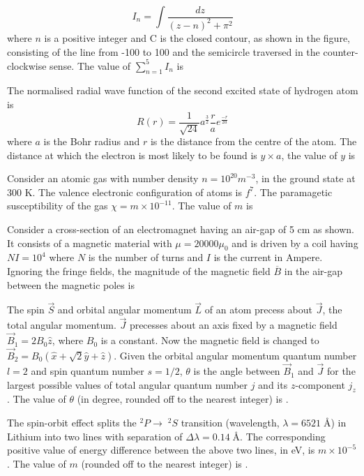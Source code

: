 		$$ I_n = \int \frac{dz}{(z-n)^2 + \pi^2} $$
		where $n$ is a positive integer and C is the closed contour, as shown in the figure, consisting of the line from -100 to 100 and the semicircle traversed in the counter-clockwise sense. The value of $\sum_{n=1}^{5} I_n $ is
	\item The normalised radial wave function of the second excited state of hydrogen atom is 
		$$ R(r) = \frac{1}{\sqrt{24}} a^{\frac{3}{2}} \frac{r}{a} e^{\frac{-r}{2a}} $$
		where $a$ is the Bohr radius and $r$ is the distance from the centre of the atom. The distance at which the electron is most likely to be found is $y \times a$, the value of $y$ is
	\item Consider an atomic gas with number density $n = 10^{20} m^{-3} $, in the ground state at 300 K. The valence electronic configuration of atoms is $f^7$. The paramagetic susceptibility of the gas $\chi = m \times 10^{-11}$. The value of $m$ is
	\item Consider a cross-section of an electromagnet having an air-gap of 5 cm as shown. It consists of a magnetic material with $\mu = 20000 \mu_0$ and is driven by a coil having $NI = 10^4$ where $N$ is the number of turns and $I$ is the current in Ampere.
		Ignoring the fringe fields, the magnitude of the magnetic field $\overline{B}$ in the air-gap between the magnetic poles is
	\item The spin $\vec{S}$ and orbital angular momentum $\vec{L}$ of an atom precess about $\vec{J}$, the total angular momentum. $\vec{J}$ precesses about an axis fixed by a magnetic field $\vec{B}_1 = 2B_0 \hat{z}$, where $B_0$ is a constant. Now the magnetic field is changed to
 $\vec{B}_2 = B_0 (\hat{x} + \sqrt{2} \hat{y} + \hat{z}).$ Given the orbital angular momentum quantum number $l = 2$ and spin quantum number $s = 1/2$, $\theta$ is the angle between $\vec{B}_1$ and $\vec{J}$ for the largest possible values of total angular quantum number $j$ and its $z$-component $j_z$. The value of $\theta$ (in degree, rounded off to the nearest integer) is \underline{  }.
	\item The spin-orbit effect splits the $^2P \rightarrow \; ^2S$ transition (wavelength, $\lambda = 6521 \; \text{\AA}$) in Lithium into two lines with separation of $\Delta \lambda = 0.14 \; \text{\AA}$. The corresponding positive value of energy difference between the above two lines, in eV, is $m \times 10^{-5}$. The value of $m$ (rounded off to the nearest integer) is \underline{ }.


